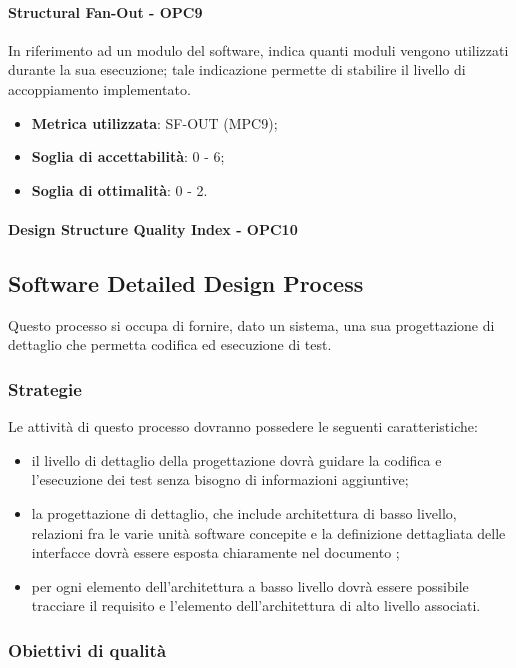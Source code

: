 \documentclass[PianoDiQualifica.tex]{subfiles}
\begin{document}
			\paragraph{Structural Fan-Out - OPC9}
			In riferimento ad un modulo del software, indica quanti moduli vengono utilizzati durante la
			sua esecuzione; tale indicazione permette di stabilire il livello di accoppiamento implementato.
			\begin{itemize}
					\item \textbf{Metrica utilizzata}: SF-OUT (MPC9);
					\item \textbf{Soglia di accettabilità}: 0 - 6;
					\item \textbf{Soglia di ottimalità}: 0 - 2.
			\end{itemize}
			\paragraph{Design Structure Quality Index - OPC10}
			
			
	\subsection{Software Detailed Design Process}
		Questo processo si occupa di fornire, dato un sistema, una sua progettazione di dettaglio che permetta codifica ed esecuzione di test.	
	
		\subsubsection{Strategie}
			Le attività di questo processo dovranno possedere le seguenti caratteristiche:
			\begin{itemize}
			\item il livello di dettaglio della progettazione dovrà guidare la codifica e l'esecuzione dei test senza bisogno di informazioni aggiuntive;
			\item la progettazione di dettaglio, che include architettura di basso livello,  relazioni fra le varie unità software concepite e la definizione dettagliata delle interfacce dovrà essere esposta chiaramente nel documento \DPdocRP{};
			\item per ogni elemento dell'architettura a basso livello dovrà essere possibile tracciare il requisito e l'elemento dell'architettura di alto livello associati.
			\end{itemize}
		
		\subsubsection{Obiettivi di qualità}
\end{document}
